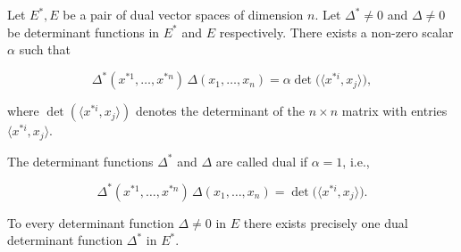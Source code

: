 Let $E^*, E$ be a pair of dual vector spaces of dimension $n$. Let $\Delta^* \neq 0$ and $\Delta \neq 0$ be determinant functions in $E^*$ and $E$ respectively. There exists a non-zero scalar $\alpha$ such that

$$\Delta^*(x^{*1}, \ldots, x^{*n}) \, \Delta(x_1, \ldots, x_n) = \alpha \det\!\big(\langle x^{*i}, x_j \rangle\big),$$

where $\det(\langle x^{*i}, x_j \rangle)$ denotes the determinant of the $n \times n$ matrix with entries $\langle x^{*i}, x_j \rangle$.

The determinant functions $\Delta^*$ and $\Delta$ are called dual if $\alpha = 1$, i.e.,

$$\Delta^*(x^{*1}, \ldots, x^{*n}) \, \Delta(x_1, \ldots, x_n) = \det\!\big(\langle x^{*i}, x_j \rangle\big).$$

To every determinant function $\Delta \neq 0$ in $E$ there exists precisely one dual determinant function $\Delta^*$ in $E^*$.

